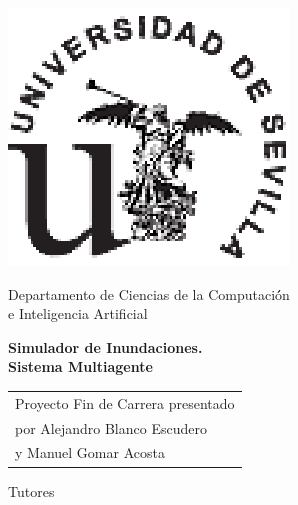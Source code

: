 \thispagestyle{empty}

{
\thispagestyle{empty}
\begin{center}
\includegraphics{figuras/titulo/logous-moderno.ps}
\end{center}
\vspace*{0cm}
\Large
\begin{center}
{\normalsize \sc
Departamento de Ciencias de la Computaci\'{ó}n \\ e Inteligencia Artificial \\}

\end{center}

\vspace{0.5cm}

\LARGE

\begin{center}
{\bf Simulador de Inundaciones. \\ Sistema Multiagente}
\end{center}

\Large

\vspace*{2cm}
\vfill

\hspace*{.5\textwidth}
\normalsize
\begin{tabular}{l}

Proyecto Fin de Carrera presentado\\
por Alejandro Blanco Escudero \\
y Manuel Gomar Acosta \\

\end{tabular} \par

\vspace*{-2.9cm}

Tutores

\vspace*{4cm}

}
